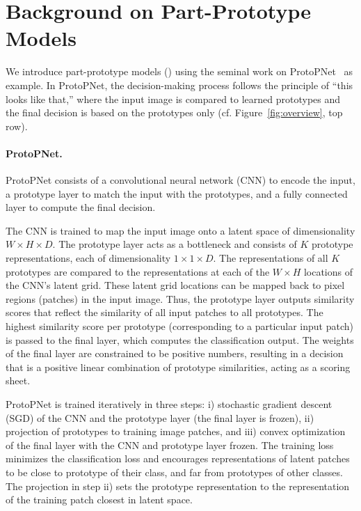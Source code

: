 \section{Background on Part-Prototype Models}
\label{sec:background}
We introduce part-prototype models (\ppms) using the seminal work on ProtoPNet~\cite{Chen_2019_ThisLooksThat} as example.
In ProtoPNet, the decision-making process follows the principle of ``this looks like that,'' where the input image is compared to learned prototypes
and the final decision is based on the prototypes only (cf. Figure~\ref{fig:overview}, top row).


\paragraph{ProtoPNet.}
ProtoPNet consists of a convolutional neural network (CNN) to encode the input, a prototype layer to match the input with the prototypes, and a fully connected layer to compute the final decision. 

The CNN is trained to map the input image onto a latent space of dimensionality $W\times H\times D$. The prototype layer acts as a bottleneck and consists of $K$ prototype representations, each of dimensionality $1\times 1\times D$. 
The representations of all $K$ prototypes are compared to the representations at each of the $W\times H$ locations of the CNN's latent grid.
These latent grid locations can be mapped back to pixel regions (patches) in the input image. 
Thus, the prototype layer outputs similarity scores that reflect the similarity of all input patches to all prototypes.
The highest similarity score per prototype (corresponding to a particular input patch) is passed to the final layer, which computes the classification output.
The weights of the final layer are constrained to be positive numbers, resulting in a decision that is a positive linear combination of prototype similarities, acting as a scoring sheet.

ProtoPNet is trained iteratively in three steps: i) stochastic gradient descent (SGD) of the CNN and the prototype layer (the final layer is frozen), ii) projection of prototypes to training image patches, and iii) convex optimization of the final layer with the CNN and prototype layer frozen. The training loss minimizes the classification loss and encourages representations of latent patches to be close to prototype of their class, and far from prototypes of other classes.
The projection in step ii) sets the prototype representation to the representation of the training patch closest in latent space.

